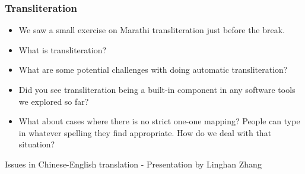 \documentclass{beamer}
\begin{document}
\begin{frame}
\frametitle{Transliteration}
\begin{itemize}
\item We saw a small exercise on Marathi transliteration just before the break. 
\item What is transliteration? \pause
\item What are some potential challenges with doing automatic transliteration? \pause
\item Did you see transliteration being a built-in component in any software tools we explored so far? \pause
\item What about cases where there is no strict one-one mapping? People can type in whatever spelling they find appropriate. How do we deal with that situation?
\end{itemize}
\end{frame}

\begin{frame} %
\centering
\Large Issues in Chinese-English translation - Presentation by Linghan Zhang
\end{frame}
\end{document}
